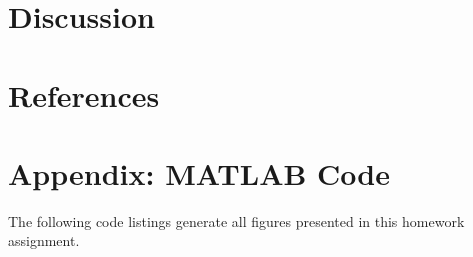 \documentclass[11pt]{article}
\begin{document}
\section{Discussion}

\section{References}

\section*{Appendix: MATLAB Code}
The following code listings generate all figures presented in this homework assignment.





\end{document}
